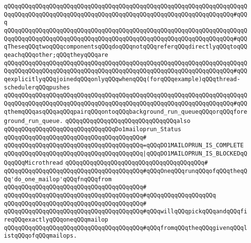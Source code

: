\verb|qQQqqQQqqQQqqQQqqQQqqQQqqQQqqQQqqQQqqQQqqQQqqQQqqQQqqQQqqQQqqQQqqQQqqQQqqQQqqQQqqQQqqQQqqQQqqQQqqQQqqQQqqQQqqQQqqQQqqQQqqQQqqQQqqQQqqQQq#qQQq|\newline
\verb|qQQqqQQqqQQqqQQqqQQqqQQqqQQqqQQqqQQqqQQqqQQqqQQqqQQqqQQqqQQqqQQqqQQqqQQqqQQqqQQqqQQqqQQqqQQqqQQqqQQqqQQqqQQqqQQqqQQqqQQqqQQqqQQqqQQqqQQq#qQQqTheseqQQqtwoqQQqcomponentsqQQqdoqQQqnotqQQqreferqQQqdirectlyqQQqtoqQQqeachqQQqother;qQQqtheyqQQqare|\newline
\verb|qQQqqQQqqQQqqQQqqQQqqQQqqQQqqQQqqQQqqQQqqQQqqQQqqQQqqQQqqQQqqQQqqQQqqQQqqQQqqQQqqQQqqQQqqQQqqQQqqQQqqQQqqQQqqQQqqQQqqQQqqQQqqQQqqQQqqQQq#qQQqexplicitlyqQQqjoinedqQQqonlyqQQqwhenqQQq(forqQQqexample)qQQqthread-schedulerqQQqpushes|\newline
\verb|qQQqqQQqqQQqqQQqqQQqqQQqqQQqqQQqqQQqqQQqqQQqqQQqqQQqqQQqqQQqqQQqqQQqqQQqqQQqqQQqqQQqqQQqqQQqqQQqqQQqqQQqqQQqqQQqqQQqqQQqqQQqqQQqqQQqqQQq#qQQqthemqQQqasqQQqaqQQqpairqQQqontoqQQqbackground_run_queueqQQqorqQQqforeground_run_queue.|\newline
\newline
\newline
\verb|qQQqqQQqqQQqqQQqqQQqqQQqqQQqqQQqalso|\newline
\verb|qQQqqQQqqQQqqQQqqQQqqQQqqQQqqQQqDo1mailoprun_Status|\newline
\verb|qQQqqQQqqQQqqQQqqQQqqQQqqQQqqQQqqQQqqQQq#|\newline
\verb|qQQqqQQqqQQqqQQqqQQqqQQqqQQqqQQqqQQqqQQq=qQQqDO1MAILOPRUN_IS_COMPLETE|\newline
\verb|qQQqqQQqqQQqqQQqqQQqqQQqqQQqqQQqqQQqqQQq|\verb#|qQQqDO1MAILOPRUN_IS_BLOCKEDqQQqqQQqMicrothread#\newline
\verb|qQQqqQQqqQQqqQQqqQQqqQQqqQQqqQQqqQQqqQQq#|\newline
\verb|qQQqqQQqqQQqqQQqqQQqqQQqqQQqqQQqqQQqqQQq#qQQqOneqQQqrunqQQqofqQQqtheqQQq'do_one_mailop'qQQqfnqQQqfrom|\newline
\verb|qQQqqQQqqQQqqQQqqQQqqQQqqQQqqQQqqQQqqQQq#|\newline
\verb|qQQqqQQqqQQqqQQqqQQqqQQqqQQqqQQqqQQqqQQq#qQQqqQQqqQQqqQQqqQQq|\newline
\verb|qQQqqQQqqQQqqQQqqQQqqQQqqQQqqQQqqQQqqQQq#|\newline
\verb|qQQqqQQqqQQqqQQqqQQqqQQqqQQqqQQqqQQqqQQq#qQQqwillqQQqpickqQQqandqQQqfireqQQqexactlyqQQqoneqQQqmailop|\newline
\verb|qQQqqQQqqQQqqQQqqQQqqQQqqQQqqQQqqQQqqQQq#qQQqfromqQQqtheqQQqgivenqQQqlistqQQqofqQQqmailops.|\newline
